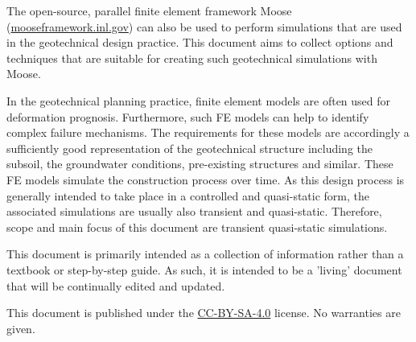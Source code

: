 The open-source, parallel finite element framework Moose
(\url{mooseframework.inl.gov}) can also be used to perform simulations that are
used in the geotechnical design practice. This document aims to collect options
and techniques that are suitable for creating such geotechnical simulations
with Moose.

In the geotechnical planning practice, finite element models are often used for
deformation prognosis. Furthermore, such FE models can help to identify complex
failure mechanisms. The requirements for these models are accordingly a
sufficiently good representation of the geotechnical structure including the
subsoil, the groundwater conditions, pre-existing structures and similar. These
FE models simulate the construction process over time. As this design process
is generally intended to take place in a controlled and quasi-static form, the
associated simulations are usually also transient and quasi-static. Therefore,
scope and main focus of this document are transient quasi-static simulations.

This document is primarily intended as a collection of information rather than
a textbook or step-by-step guide. As such, it is intended to be a 'living'
document that will be continually edited and updated.

This document is published under the
\href{https://creativecommons.org/licenses/by-sa/4.0/}{CC-BY-SA-4.0} license.
No warranties are given.